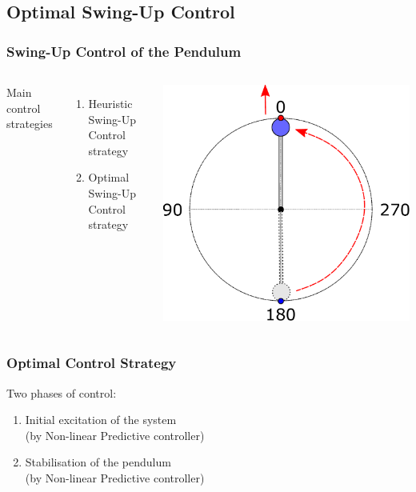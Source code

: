 \documentclass[]{beamer}
\begin{document}
\subsection{Optimal Swing-Up Control}
\begin{frame}
	\frametitle{Swing-Up Control of the Pendulum}	
	\begin{columns}[c]	
		Main control strategies
		\begin{enumerate}
			\item \textcolor{mygray}{Heuristic Swing-Up Control strategy}
			\item Optimal Swing-Up Control strategy\\			
		\end{enumerate}
		\includegraphics[scale=0.29]{images/OP_total.pdf}
	\end{columns}
\end{frame}
\begin{frame}
	\frametitle{Optimal Control Strategy}
		Two phases of control:
	\begin{enumerate}
		\item Initial excitation of the system\\ (by Non-linear Predictive controller)\\
		\item Stabilisation of the pendulum\\(by Non-linear Predictive controller)
	\end{enumerate}
\end{frame}
\end{document}

